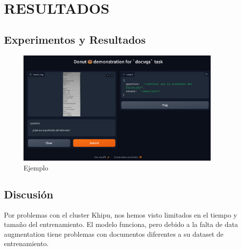 \documentclass[../main.tex]{subfiles}
\begin{document}
\chapter{RESULTADOS}

\section{Experimentos y Resultados}


\begin{figure}[H]
	\centering
	\includegraphics[width=0.9\textwidth]{docvqa.png}
	\caption{Ejemplo}
\end{figure}



\section{Discusión}

Por problemas con el cluster Khipu, nos hemos visto limitados en el tiempo y tamaño del entrenamiento.
El modelo funciona, pero debido a la falta de data augmentation tiene problemas con documentos diferentes
a su dataset de entrenamiento.

\end{document}
